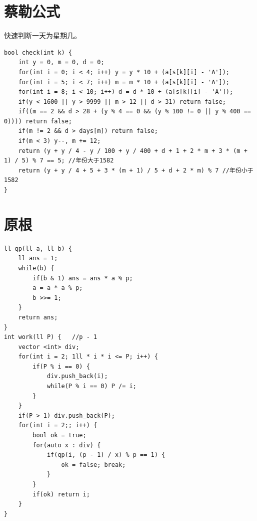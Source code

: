 \documentclass[a4paper,11pt,twoside,fontset = fandol,UTF8]{ctexbook} %
\begin{document}
	\section{蔡勒公式}
	快速判断一天为星期几。
	\begin{lstlisting}
bool check(int k) {
    int y = 0, m = 0, d = 0;
    for(int i = 0; i < 4; i++) y = y * 10 + (a[s[k][i] - 'A']);
    for(int i = 5; i < 7; i++) m = m * 10 + (a[s[k][i] - 'A']);
    for(int i = 8; i < 10; i++) d = d * 10 + (a[s[k][i] - 'A']);
    if(y < 1600 || y > 9999 || m > 12 || d > 31) return false;
    if((m == 2 && d > 28 + (y % 4 == 0 && (y % 100 != 0 || y % 400 == 0)))) return false;
    if(m != 2 && d > days[m]) return false;
    if(m < 3) y--, m += 12;
    return (y + y / 4 - y / 100 + y / 400 + d + 1 + 2 * m + 3 * (m + 1) / 5) % 7 == 5; //年份大于1582
	return (y + y / 4 + 5 + 3 * (m + 1) / 5 + d + 2 * m) % 7 //年份小于1582 
}
	\end{lstlisting}
	\section{原根}
	\begin{lstlisting}
ll qp(ll a, ll b) {
    ll ans = 1;
    while(b) {
        if(b & 1) ans = ans * a % p;
        a = a * a % p;
        b >>= 1;
    }
    return ans;
}
int work(ll P) {   //p - 1
    vector <int> div;
    for(int i = 2; 1ll * i * i <= P; i++) {
        if(P % i == 0) {
            div.push_back(i);
            while(P % i == 0) P /= i;
        }
    }
    if(P > 1) div.push_back(P);
    for(int i = 2;; i++) {
        bool ok = true;
        for(auto x : div) {
            if(qp(i, (p - 1) / x) % p == 1) {
                ok = false; break;
            }
        }
        if(ok) return i;
    }
} 
	\end{lstlisting}
\end{document}
